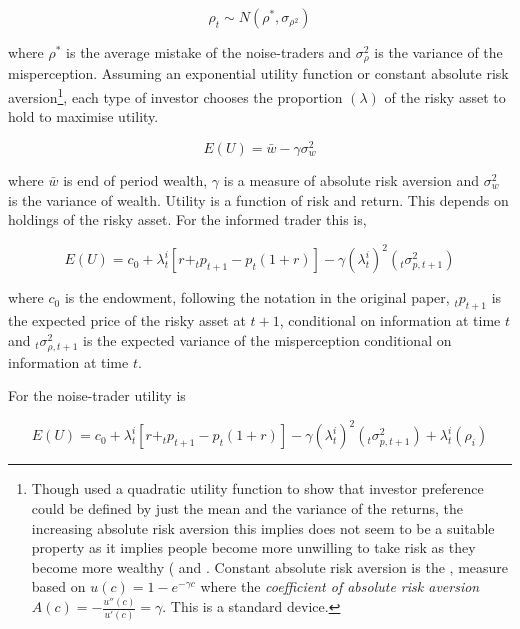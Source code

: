 \documentclass[12pt, a4paper, oneside]{article} %
\begin{document}
\begin{equation}
\rho_t \sim N(\rho^*, \sigma_{\rho^2})
\end{equation}

where $\rho^*$ is the average mistake of the noise-traders and $\sigma_{\rho}^2$ is the variance of the misperception.      Assuming an exponential utility function or constant absolute risk aversion\footnote{Though \citep{TobinLiquidity} used a quadratic utility function to show that investor preference could be defined by just the mean and the variance of the returns, the increasing absolute risk aversion this implies does not seem to be a suitable property as it implies people become more unwilling to take risk as they become more wealthy (\citep{Hicks1962} and \citep{ArrowRisk}.   Constant absolute risk aversion is the \citep{PrattCARA}, \citep{ArrowRisk}  measure based on $u(c) = 1 - e^{-\gamma c}$ where the \emph{coefficient of absolute risk aversion} $A(c) = -\frac{u''(c)}{u'(c)} = \gamma$.  This is a standard device.}, each type of investor chooses the proportion $(\lambda)$ of the risky asset to hold to maximise utility.  

\begin{equation}
E(U) = \bar{w} - \gamma \sigma_{w}^2
\end{equation} 

where $\bar{w}$ is end of period wealth, $\gamma$ is a measure of absolute risk aversion and $\sigma_w^2$ is the variance of wealth. Utility is a function of risk and return.  This depends on holdings of the risky asset.   For the informed trader this is,  

\begin{equation}
E(U) = c_0 + \lambda_t^i[r + _tp_{t+1} - p_t(1 + r)] - \gamma (\lambda_t^i)^2 \left (_t\sigma^2_{p, t+1} \right ) 
\end{equation}

where $c_0$ is the endowment, following the notation in the original paper, $_tp_{t+1}$ is the expected price of the risky asset at $t + 1$, conditional on information at time $t$ and $_t\sigma^2_{\rho, t+1}$ is the expected variance of the misperception conditional on information at time $t$. 

For the noise-trader utility is 

\begin{equation}
E(U) = c_0 + \lambda_t^i[r + _tp_{t+1} - p_t(1 + r)] - \gamma (\lambda_t^i)^2 \left (_t\sigma^2_{p, t+1} \right ) + \lambda_t^i (\rho_i) 
\end{equation}
\end{document}
